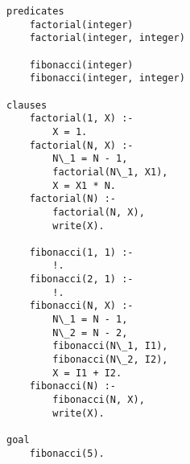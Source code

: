 \begin{lstlisting}[style=lispStyle, caption={Получение элементов списка с помощью команд car и cdr.},
                    label={lst:fact}]
predicates
    factorial(integer)
    factorial(integer, integer)

    fibonacci(integer)
    fibonacci(integer, integer)

clauses
    factorial(1, X) :-
        X = 1.
    factorial(N, X) :-
        N\_1 = N - 1,
        factorial(N\_1, X1),
        X = X1 * N.
    factorial(N) :-
        factorial(N, X),
        write(X).

    fibonacci(1, 1) :-
        !.
    fibonacci(2, 1) :-
        !.
    fibonacci(N, X) :-
        N\_1 = N - 1,
        N\_2 = N - 2,
        fibonacci(N\_1, I1),
        fibonacci(N\_2, I2),
        X = I1 + I2.
    fibonacci(N) :-
        fibonacci(N, X),
        write(X).

goal
    fibonacci(5).

\end{lstlisting}

